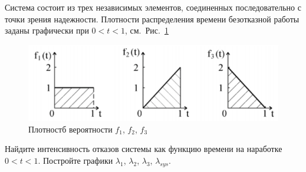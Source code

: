 \Introduction

Система состоит из трех независимых элементов, соединенных последовательно с точки зрения надежности. Плотности распределения времени безотказной работы заданы графически при $0<t<1$, см.~Рис.~\ref{img:10-0}

\begin{figure}[h]
  \centering
  \includegraphics[width=.9\linewidth]{assets/baseConnect}
  \caption{Плотностб вероятности $f_{1}$, $f_{2}$, $f_{3}$}
  \label{img:10-0}
\end{figure}

Найдите интенсивность отказов системы как функцию времени на наработке $0 < t < 1$. Постройте графики $\lambda_{1}$, $\lambda_{2}$, $\lambda_{3}$, $\lambda_{sys}$.
